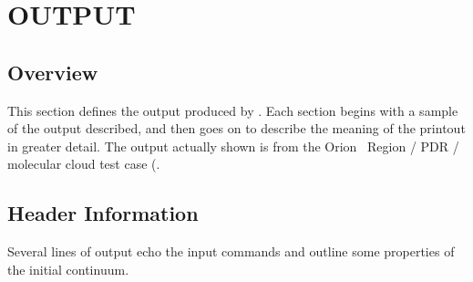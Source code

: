 \chapter{OUTPUT}
\label{sec:output}

\section{Overview}

This section defines the output produced by \Cloudy.  Each section begins
with a sample of the output described, and then goes on to describe the
meaning of the printout in greater detail.  The output actually shown is
from the Orion \hii\ Region / PDR / molecular cloud test case
(.

\section{Header Information}

Several lines of output echo the input commands and outline some
properties of the initial continuum.

